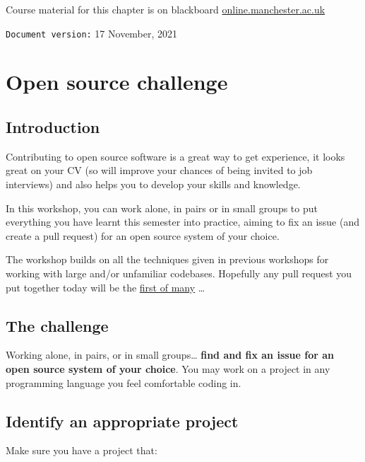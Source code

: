 \documentclass[
]{book}
\begin{document}
Course material for this chapter is on blackboard \href{https://online.manchester.ac.uk}{online.manchester.ac.uk}

\texttt{Document\ version:} 17 November, 2021

\hypertarget{opening}{%
\chapter{Open source challenge}\label{opening}}

\hypertarget{introduction-1}{%
\section{Introduction}\label{introduction-1}}

Contributing to open source software is a great way to get experience, it looks great on your CV (so will improve your chances of being invited to job interviews) and also helps you to develop your skills and knowledge. \citep{experiencing, spinellis}

In this workshop, you can work alone, in pairs or in small groups to put everything you have learnt this semester into practice, aiming to fix an issue (and create a pull request) for an open source system of your choice.

The workshop builds on all the techniques given in previous workshops for working with large and/or unfamiliar codebases.
Hopefully any pull request you put together today will be the \href{http://firstpr.me}{first of many} \ldots{}

\hypertarget{challenge}{%
\section{The challenge}\label{challenge}}

Working alone, in pairs, or in small groups\ldots{} \textbf{find and fix an issue for an open source system of your choice}.
You may work on a project in any programming language you feel comfortable coding in.

\hypertarget{projecti}{%
\section{Identify an appropriate project}\label{projecti}}

Make sure you have a project that:
\end{document}
